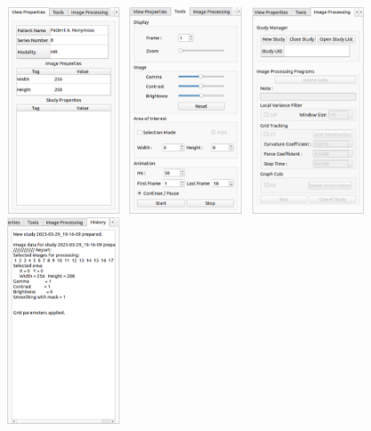{\begin {center}
        \centering
        \includegraphics[width=3.5cm, height=6.10cm]{media/existing_app/tabs/view_properties.png}
        \includegraphics[width=3.5cm, height=6.10cm]{media/existing_app/tabs/tools.png}
        \includegraphics[width=3.5cm, height=6.10cm]{media/existing_app/tabs/image_processing_inactive.png}
        \includegraphics[width=3.5cm, height=6.10cm]{media/existing_app/tabs/history.png}
\end {center}

}

